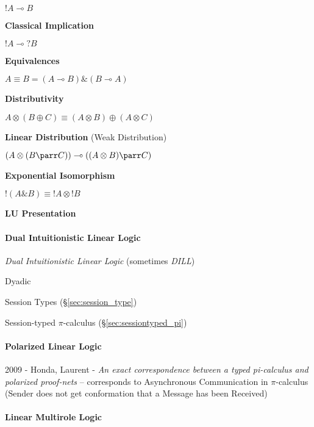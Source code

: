 $!A \multimap B$


\textbf{Classical Implication}

$!A \multimap ?B$


\textbf{Equivalences}

$A \equiv B = (A \multimap B) \& (B \multimap A)$


\textbf{Distributivity}

$A \otimes (B \oplus C) \equiv (A \otimes B) \oplus (A \otimes C)$


\textbf{Linear Distribution} (Weak Distribution)

$(A \otimes (B \parr C)) \multimap ((A \otimes B) \parr C)$


\textbf{Exponential Isomorphism}

$!(A \& B) \equiv !A \otimes !B$


\textbf{LU Presentation}



\paragraph{Dual Intuitionistic Linear Logic}\hfill
\label{sec:dual_linear_logic}

\cite{andreoli92}

\emph{Dual Intuitionistic Linear Logic} (sometimes \emph{DILL})

Dyadic

Session Types (\S\ref{sec:session_type})

Session-typed $\pi$-calculus (\S\ref{sec:sessiontyped_pi})



\paragraph{Polarized Linear Logic}\label{sec:polarized_linear_logic}\hfill

2009 - Honda, Laurent - \emph{An exact correspondence between a typed
  pi-calculus and polarized proof-nets} -- corresponds to Asynchronous
Communication in $\pi$-calculus (Sender does not get conformation that a
Message has been Received)



\paragraph{Linear Multirole Logic}\label{sec:lmrl}\hfill

\begingroup

\newcommand{\msg}{\mathtt{msg}}
\newcommand{\nil}{\mathtt{nil}}


